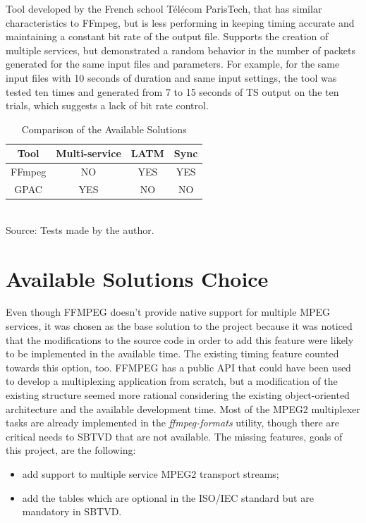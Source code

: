 \documentclass[
	12pt,				%
	openright,			%
	twoside,			%
	a4paper,			%
	brazil,
	french,				%
	english
	]{abntex2}
\begin{document}
Tool developed by the French school Télécom ParisTech, that has similar characteristics to FFmpeg, but is less performing in keeping timing accurate and maintaining a constant bit rate of the output file. Supports the creation of multiple services, but demonstrated a random behavior in the number of packets generated for the same input files and parameters. For example, for the same input files with 10 seconds of duration and same input settings, the tool was tested ten times and generated from 7 to 15 seconds of TS output on the ten trials, which suggests a lack of bit rate control.

\begin{table}[!htpd]
\caption{Comparison of the Available Solutions}
\begin{center}
\begin{tabular}{|c|c|c|c|}
\hline
Tool & Multi-service & LATM & Sync\\
\hline
FFmpeg & NO & YES & YES\\
\hline
GPAC & YES & NO & NO\\
\hline
\end{tabular}
\label{tab_comparison_tools}
\\Source: Tests made by the author.
\end{center}
\end{table}

\section{Available Solutions Choice}

Even though FFMPEG doesn't provide native support for multiple MPEG services, it was chosen as the base solution to the project because it was noticed that the modifications to the source code in order to add this feature were likely to be implemented in the available time. The existing timing feature counted towards this option, too. FFMPEG has a public API that could have been used to develop a multiplexing application from scratch, but a modification of the existing structure seemed more rational considering the existing object-oriented architecture and the available development time. Most of the MPEG2 multiplexer tasks are already implemented in the \textit{ffmpeg-formats} utility, though there are critical needs to SBTVD that are not available. The missing features, goals of this project, are the following:

\begin{itemize}
\item{add support to multiple service MPEG2 transport streams;}
\item{add the tables which are optional in the ISO/IEC standard but are mandatory in SBTVD.}
\end{itemize}
\end{document}
